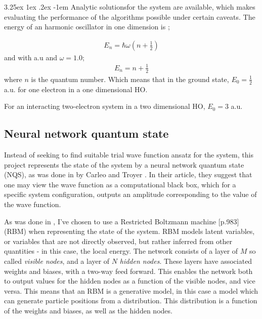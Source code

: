 \documentclass[%
oneside,                 %
final,                   %
10pt]{article}
\makeatletter
\renewcommand\paragraph{\@startsection{paragraph}{5}{\z@}%
  {3.25ex \@plus1ex \@minus.2ex}%
  {-1em}%
  {\normalfont\normalsize\bfseries}}
\makeatother
\begin{document}
\paragraph{Analytic solutions}for the system are available, which makes evaluating the performance of the algorithms possible under certain caveats. The energy of an harmonic oscillator in one dimension is \citep{Griffiths95};

\begin{equation}
\begin{aligned}
E_n = \hbar \omega (n+\frac{1}{2})
\end{aligned}
\end{equation}
and with a.u and $\omega=1.0$;
\begin{equation}
\begin{aligned}
E_n = n+\frac{1}{2}
\end{aligned}
\end{equation}
where $n$ is the quantum number. 
Which means that in the ground state, $E_0=\frac{1}{2}$ a.u. for one electron in a one dimensional HO.

For an interacting two-electron system in a two dimensional HO, $E_0=3$ a.u. \citep{taut}





\subsection{Neural network quantum state}
Instead of seeking to find suitable trial wave function ansatz for the system, this project represents the state of the system by a neural network quantum state (NQS), as was done in by Carleo and Troyer \citep{CarleoGiuseppe2017Stqm}. In their article, they suggest that one may view the wave function as a computational black box, which for a specific system configuration, outputs an amplitude corresponding to the value of the wave function. 

As was done in \citep{CarleoGiuseppe2017Stqm}, I've chosen to use a Restricted Boltzmann machine \cite{MLMurphy}[p.983] (RBM) when representing the state of the system. RBM models latent variables, or variables that are not directly observed, but rather inferred from other quantities - in this case, the local energy. The network consists of a layer of $M$ so called \textit{visible nodes}, and a layer of $N$ \textit{hidden nodes}. These layers have associated weights and biases, with a two-way feed forward. This enables the network both to output values for the hidden nodes as a function of the visible nodes, and vice versa. This means that an RBM is a generative model, in this case a model which can generate particle positions from a distribution. This distribution is a function of the weights and biases, as well as the hidden nodes. 
\end{document}
